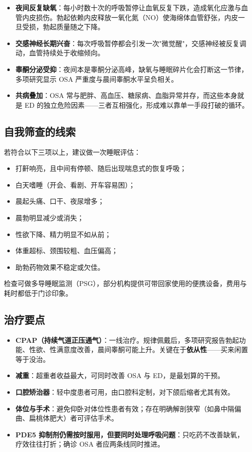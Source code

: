 \begin{itemize}
	\item \textbf{夜间反复缺氧}：每小时数十次的呼吸暂停让血氧反复下跌，造成氧化应激与血管内皮损伤。勃起依赖内皮释放一氧化氮（NO）使海绵体血管舒张，内皮一旦受损，勃起质量随之下降。
	\item \textbf{交感神经长期兴奋}：每次呼吸暂停都会引发一次"微觉醒"，交感神经被反复调动，血管持续处于收缩倾向。
	\item \textbf{睾酮分泌受抑}：夜间本是睾酮分泌高峰，缺氧与睡眠碎片化会打断这一节律，多项研究显示 OSA 严重度与晨间睾酮水平呈负相关。
	\item \textbf{共病叠加}：OSA 常与肥胖、高血压、糖尿病、血脂异常并存，而这些本身就是 ED 的独立危险因素——三者互相强化，形成难以靠单一手段打破的循环。
\end{itemize}

\subsection{自我筛查的线索}

若符合以下三项以上，建议做一次睡眠评估：

\begin{itemize}
	\item 打鼾响亮，且中间有停顿、随后出现喘息式的恢复呼吸；
	\item 白天嗜睡（开会、看剧、开车容易困）；
	\item 晨起头痛、口干、夜尿增多；
	\item 晨勃明显减少或消失；
	\item 性欲下降、精力明显不如从前；
	\item 体重超标、颈围较粗、血压偏高；
	\item 助勃药物效果不稳定或欠佳。
\end{itemize}

\noindent 检查可做多导睡眠监测（PSG），部分机构提供可带回家使用的便携设备，费用与耗时都低于门诊印象。

\subsection{治疗要点}

\begin{itemize}
	\item \textbf{CPAP（持续气道正压通气）}：一线治疗。规律佩戴后，多项研究报告勃起功能、性欲、性满意度改善，晨间睾酮可能上升。关键在于\textbf{依从性}——买来闲置等于没治。
	\item \textbf{减重}：超重者收益最大，可同时改善 OSA 与 ED，是最划算的干预。
	\item \textbf{口腔矫治器}：轻中度患者可用，由口腔科定制，对下颌后缩者尤其有效。
	\item \textbf{体位与手术}：避免仰卧对体位性患者有效；存在明确解剖狭窄（如鼻中隔偏曲、扁桃体肥大）者可评估手术。
	\item \textbf{PDE5 抑制剂仍需按时服用，但要同时处理呼吸问题}：只吃药不改善缺氧，疗效往往打折；确诊 OSA 者应两条线同时推进。
\end{itemize}

